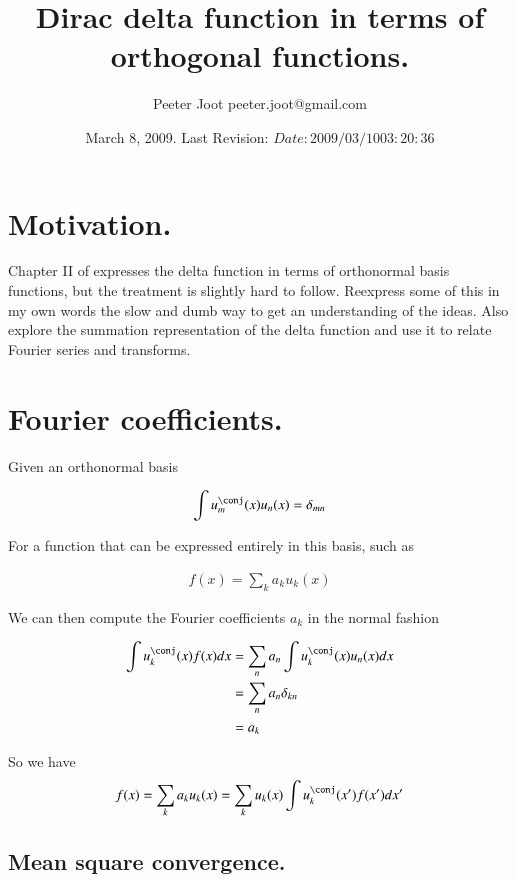 \documentclass{article}
\title{ Dirac delta function in terms of orthogonal functions. }
\author{Peeter Joot \quad peeter.joot@gmail.com }
\date{ March 8, 2009.  Last Revision: $Date: 2009/03/10 03:20:36 $ }
\begin{document}
\maketitle{}

\section{ Motivation. }

Chapter II of \cite{pauli2000wm} expresses the delta function in terms of
orthonormal basis functions, but the treatment is slightly
hard to follow.  
Reexpress some of this in my own words the slow and dumb way to get an
understanding of the ideas.  Also explore the summation representation of
the delta function and use it to relate Fourier series and transforms.

\section{ Fourier coefficients. }

Given an orthonormal basis 

\begin{align*}
\int u_m^\conj(x) u_n(x) = \delta_{mn}
\end{align*}

For a function that can be expressed entirely in this basis, such as

\begin{align*}
f(x) = \sum_k a_k u_k(x)
\end{align*}

We can then compute the Fourier coefficients $a_k$ in the normal fashion

\begin{align*}
\int u_k^\conj(x) f(x) dx 
&= \sum_n a_n \int u_k^\conj(x) u_n(x) dx \\
&= \sum_n a_n \delta_{kn} \\
&= a_k \\
\end{align*}

So we have 
\begin{align*}
f(x) = \sum_k a_k u_k(x)  = \sum_k u_k(x) \int u_k^\conj(x') f(x') dx'
\end{align*}

\subsection{ Mean square convergence. }
\end{document}
